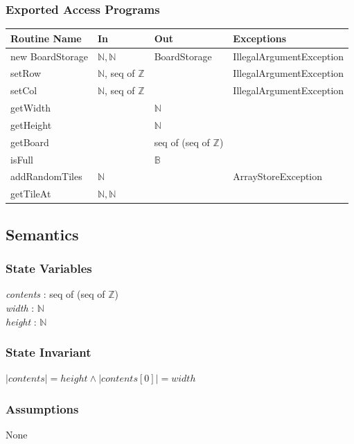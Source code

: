 \documentclass{article}
\begin{document}
		\subsubsection*{Exported Access Programs}
			\begin{tabular}{|l|l|l|p{5cm}|}
				\hline
				\textbf{Routine Name} & \textbf{In} & \textbf{Out} & \textbf{Exceptions} \\
				\hline
				new BoardStorage & $\mathbb{N}, \mathbb{N}$ & BoardStorage & IllegalArgumentException\\
				\hline
				setRow & $\mathbb{N}$, seq of $\mathbb{Z}$ & & IllegalArgumentException\\
				\hline
				setCol & $\mathbb{N}$, seq of $\mathbb{Z}$ & & IllegalArgumentException\\
				\hline
				getWidth & & $\mathbb{N}$ & \\
				\hline
				getHeight & & $\mathbb{N}$ & \\
				\hline
				getBoard & & seq of (seq of $\mathbb{Z}$) & \\
				\hline
				isFull & & $\mathbb{B}$ & \\
				\hline
				addRandomTiles & $\mathbb{N}$ & & ArrayStoreException \\
				\hline
				getTileAt & $\mathbb{N}, \mathbb{N}$ & & \\
				\hline
			\end{tabular}

	\subsection*{Semantics}

		\subsubsection*{State Variables}
			\textit{contents} : seq of (seq of $\mathbb{Z}$)\\
			\textit{width} : $\mathbb{N}$\\
			\textit{height} : $\mathbb{N}$

		\subsubsection*{State Invariant}
			$|contents| = height \wedge |contents[0]| = width$

		\subsubsection*{Assumptions}
			None
\end{document}
